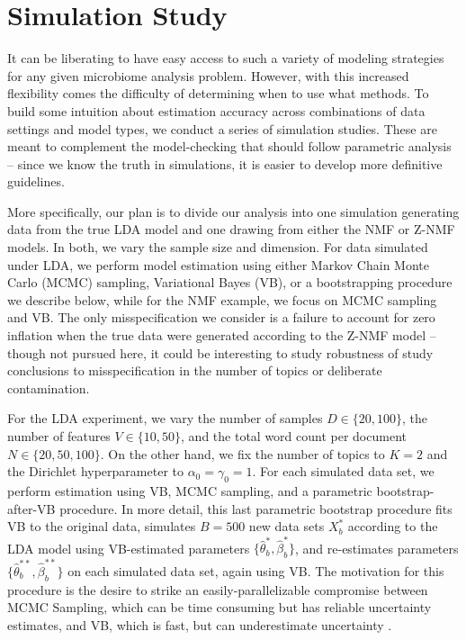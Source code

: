 \documentclass[oupdraft]{bio}
\begin{document}
\section{Simulation Study}

It can be liberating to have easy access to such a variety of modeling
strategies for any given microbiome analysis problem. However, with this
increased flexibility comes the difficulty of determining when to use what
methods. To build some intuition about estimation accuracy across combinations
of data settings and model types, we conduct a series of simulation studies. These are
meant to complement the model-checking that should follow parametric analysis --
since we know the truth in simulations, it is easier to develop more definitive
guidelines.

More specifically, our plan is to divide our analysis into one simulation
generating data from the true LDA model and one drawing from either the NMF or
Z-NMF models. In both, we vary the sample size and dimension. For data simulated
under LDA, we perform model estimation using either Markov Chain Monte Carlo
(MCMC) sampling, Variational Bayes (VB), or a bootstrapping procedure we
describe below, while for the NMF example, we focus on MCMC sampling and VB. The
only misspecification we consider is a failure to account for zero inflation
when the true data were generated according to the Z-NMF model -- though not
pursued here, it could be interesting to study robustness of study conclusions
to misspecification in the number of topics or deliberate contamination.

For the LDA experiment, we vary the number of samples $D \in \{20, 100\}$, the
number of features $V \in \{10, 50\}$, and the total word count per document $N
\in \{20, 50, 100\}$. On the other hand, we fix the number of topics to $K = 2$
and the Dirichlet hyperparameter to $\alpha_{0} = \gamma_{0} = 1$. For each
simulated data set, we perform estimation using VB, MCMC
sampling, and a parametric bootstrap-after-VB procedure. In more detail, this
last parametric bootstrap procedure fits VB to the original data, simulates $B =
500$ new data sets $X^{\ast}_{b}$ according to the LDA model using VB-estimated
parameters $\{\hat{\theta}^{\ast}_{b}, \hat{\beta}^{\ast}_{b}\}$, and
re-estimates parameters $\{\hat{\theta}^{\ast\ast}_{b},
\hat{\beta}^{\ast\ast}_{b}\}$ on each simulated data set, again using VB. The
motivation for this procedure is the desire to strike an easily-parallelizable
compromise between MCMC Sampling, which can be time consuming but has reliable
uncertainty estimates, and VB, which is fast, but can
underestimate uncertainty \citep{wang2005inadequacy}.
\end{document}
